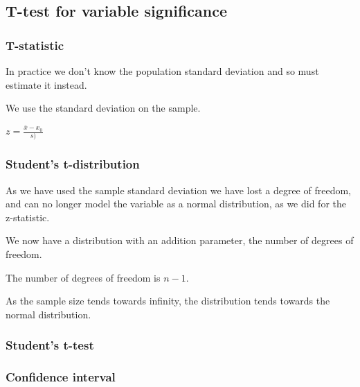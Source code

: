 
\subsection{T-test for variable significance}

\subsubsection{T-statistic}

In practice we don't know the population standard deviation and so must estimate it instead.

We use the standard deviation on the sample.

\(z=\frac{\bar x-x_0}{s) }\)

\subsubsection{Student's t-distribution}

As we have used the sample standard deviation we have lost a degree of freedom, and can no longer model the variable as a normal distribution, as we did for the z-statistic.

We now have a distribution with an addition parameter, the number of degrees of freedom.

The number of degrees of freedom is \(n-1\).

As the sample size tends towards infinity, the distribution tends towards the normal distribution.

\subsubsection{Student's t-test}

\subsubsection{Confidence interval}


